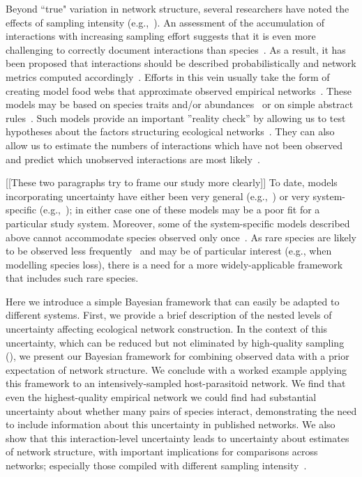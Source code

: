 \documentclass[12pt]{article}
\begin{document}
\begin{spacing}{2.0}
    Beyond ``true" variation in network structure, several researchers have noted the effects of sampling intensity (e.g.,~\citealp{Martinez1999,Bluthgen2006,Bluthgen2007,Jordano2016}). An assessment of the accumulation of interactions with increasing sampling effort suggests that it is even more challenging to correctly document interactions than species~\citep{Guimera2009,Poisot2012,Bartomeus2013,Jordano2016,Giron2018,Graham2018}. As a result, it has been proposed that interactions should be described probabilistically and network metrics computed accordingly~\citep{Bartomeeus2013,Poisot2016}. Efforts in this vein usually take the form of creating model food webs that approximate observed empirical networks~\citep{Allesina2008,Guimera2009,Williams2010,Rohr2016}. These models may be based on species traits and/or abundances~\citep{Rohr2016,Weinstein2017,Weinstein2017a,Graham2018} or on simple abstract rules~\citep{Allesina2008,Guimera2009,Williams2010}. Such models provide an important ''reality check'' by allowing us to test hypotheses about the factors structuring ecological networks~\citep{Bartomeus2013,Weinstein2017.Weinstein2017a,Graham2018}. They can also allow us to estimate the numbers of interactions which have not been observed~\citep{Jordano2016,Weinstein2017a} and predict which unobserved interactions are most likely~\citep{Guimera2009,Bartomeus2013}. 


    [[These two paragraphs try to frame our study more clearly]]
    To date, models incorporating uncertainty have either been very general (e.g.,~\citet{Guimera2009,Gravel2013}) or very system-specific (e.g.,~\citet{Bartomeus2013,Weinstein2017,Weinstein2017a,Graham2018}); in either case one of these models may be a poor fit for a particular study system. Moreover, some of the system-specific models described above cannot accommodate species observed only once~\citep{Bartomeus2013,Weinstein2017}. As rare species are likely to be observed less frequently~\citep{Bluthgen2010} and may be of particular interest (e.g., when modelling species loss), there is a need for a more widely-applicable framework that includes such rare species. 


    Here we introduce a simple Bayesian framework that can easily be adapted to different systems. First, we provide a brief description of the nested levels of uncertainty affecting ecological network construction. In the context of this uncertainty, which can be reduced but not eliminated by high-quality sampling (\citealp[see Box 1]{Bartomes2013}), we present our Bayesian framework for combining observed data with a prior expectation of network structure. We conclude with a worked example applying this framework to an intensively-sampled host-parasitoid network. We find that even the highest-quality empirical network we could find had substantial uncertainty about whether many pairs of species interact, demonstrating the need to include information about this uncertainty in published networks. We also show that this interaction-level uncertainty leads to uncertainty about estimates of network structure, with important implications for comparisons across networks; especially those compiled with different sampling intensity~\citep{Weinstein2017}.



\end{spacing}
\end{document}
